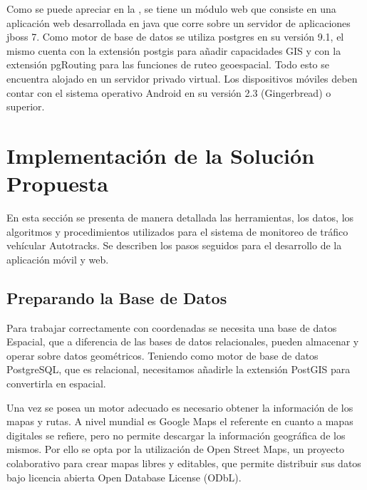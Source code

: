 Como se puede apreciar en la , se tiene un módulo web que consiste en una aplicación web desarrollada en java que corre sobre un servidor de aplicaciones jboss 7. Como motor de base de datos se utiliza postgres en su versión 9.1, el mismo cuenta con la extensión postgis para añadir capacidades GIS y con la extensión pgRouting para las funciones de ruteo geoespacial. Todo esto se encuentra alojado en un servidor privado virtual. Los dispositivos móviles deben contar con el sistema operativo Android en su versión 2.3 (Gingerbread) o superior.

\section{Implementación de la Solución Propuesta}

En esta sección se presenta de manera detallada las herramientas, los datos, los algoritmos y procedimientos utilizados para el sistema de monitoreo de tráfico vehícular Autotracks. Se describen los pasos seguidos para el desarrollo de la aplicación móvil y web.

\subsection{Preparando la Base de Datos}
\label{base-de-datos}

Para trabajar correctamente con coordenadas se necesita una base de datos Espacial, que a diferencia de las bases de datos relacionales, pueden almacenar y operar sobre datos geométricos. Teniendo como motor de base de datos PostgreSQL, que es relacional, necesitamos añadirle la extensión PostGIS para convertirla en espacial.

Una vez se posea un motor adecuado es necesario obtener la información de los mapas y rutas. A nivel mundial es Google Maps el referente en cuanto a mapas digitales se refiere, pero no permite descargar la información geográfica de los mismos. Por ello se opta por la utilización de Open Street Maps, un proyecto colaborativo para crear mapas libres y editables, que permite distribuir sus datos bajo licencia abierta Open Database License (ODbL).

